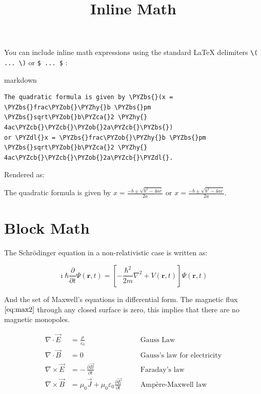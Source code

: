 \documentclass[a4paper,twoside]{article}
\title{Inline Math}
\author{}\date{}
\begin{document}
\maketitle

\thispagestyle{plain}
You can include inline math expressions using the standard \LaTeX{} delimiters \texttt{\textbackslash{}( ... \textbackslash{})} or \texttt{\$ ... \$} :

\begin{code}{markdown}{}{}
\begin{Verbatim}[commandchars=\\\{\},breaklines, breakanywhere, commandchars=\\\{\}]
The quadratic formula is given by \PYZbs{}(x = \PYZbs{}frac\PYZob{}\PYZhy{}b \PYZbs{}pm \PYZbs{}sqrt\PYZob{}b\PYZca{}2 \PYZhy{} 4ac\PYZcb{}\PYZcb{}\PYZob{}2a\PYZcb{}\PYZbs{})
or \PYZdl{}x = \PYZbs{}frac\PYZob{}\PYZhy{}b \PYZbs{}pm \PYZbs{}sqrt\PYZob{}b\PYZca{}2 \PYZhy{} 4ac\PYZcb{}\PYZcb{}\PYZob{}2a\PYZcb{}\PYZdl{}.
\end{Verbatim}
\end{code}
Rendered as:

\begin{displayquote}

The quadratic formula is given by $x = \frac{-b \pm \sqrt{b^2 - 4ac}}{2a}$
or $x = \frac{-b \pm \sqrt{b^2 - 4ac}}{2a}$.

\end{displayquote}
\section{Block Math}\label{block-math}

The Schrödinger equation in a non-relativistic case is written as:

$$
\imath \hbar \frac{\partial}{\partial t} \Psi(\mathbf{r},t) =
\left[ -\frac{\hbar^2}{2m} \nabla^2 + V(\mathbf{r},t) \right] \Psi(\mathbf{r},t)
$$

And the set of Maxwell's equations in differential form. The magnetic flux $\eqref{eq:max2}$ through any closed surface is zero, this implies that there are no magnetic monopoles.

\begin{align}
\nabla \cdot \vec{E} &= \frac{\rho}{\varepsilon_0} \quad &&\text{Gauss Law}\\[4pt]
\nabla \cdot \vec{B} &= 0 \quad &&\text{Gauss's law for electricity} \label{eq:max2}\\[4pt]
\nabla \times \vec{E} &= -\,\frac{\partial \vec{B}}{\partial t}
    \quad &&\text{Faraday's law}\\[4pt]
\nabla \times \vec{B} &= \mu_0 \vec{J} + \mu_0 \varepsilon_0
    \frac{\partial \vec{E}}{\partial t}
\quad &&\text{Ampère-Maxwell law}
\end{align}
\end{document}
